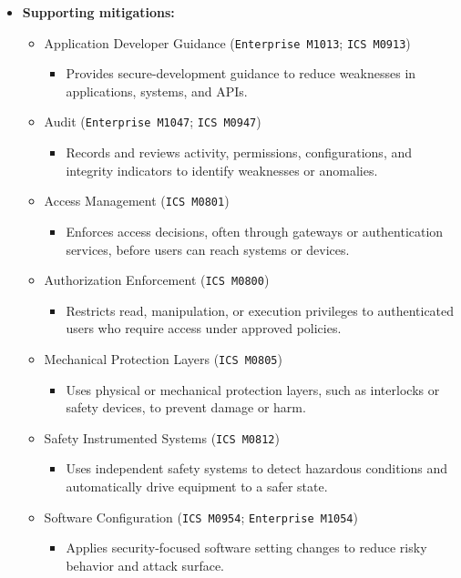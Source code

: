 \documentclass[10pt,a4paper,oneside]{report}
\begin{document}
\begin{itemize}
\item \textbf{Supporting mitigations:}
\begin{itemize}
\item Application Developer Guidance (\texttt{Enterprise M1013}; \texttt{ICS M0913})
\begin{itemize}
\item Provides secure-development guidance to reduce weaknesses in applications, systems, and APIs.
\end{itemize}
\item Audit (\texttt{Enterprise M1047}; \texttt{ICS M0947})
\begin{itemize}
\item Records and reviews activity, permissions, configurations, and integrity indicators to identify weaknesses or anomalies.
\end{itemize}
\item Access Management (\texttt{ICS M0801})
\begin{itemize}
\item Enforces access decisions, often through gateways or authentication services, before users can reach systems or devices.
\end{itemize}
\item Authorization Enforcement (\texttt{ICS M0800})
\begin{itemize}
\item Restricts read, manipulation, or execution privileges to authenticated users who require access under approved policies.
\end{itemize}
\item Mechanical Protection Layers (\texttt{ICS M0805})
\begin{itemize}
\item Uses physical or mechanical protection layers, such as interlocks or safety devices, to prevent damage or harm.
\end{itemize}
\item Safety Instrumented Systems (\texttt{ICS M0812})
\begin{itemize}
\item Uses independent safety systems to detect hazardous conditions and automatically drive equipment to a safer state.
\end{itemize}
\item Software Configuration (\texttt{ICS M0954}; \texttt{Enterprise M1054})
\begin{itemize}
\item Applies security-focused software setting changes to reduce risky behavior and attack surface.
\end{itemize}
\end{itemize}
\end{itemize}
\end{document}
